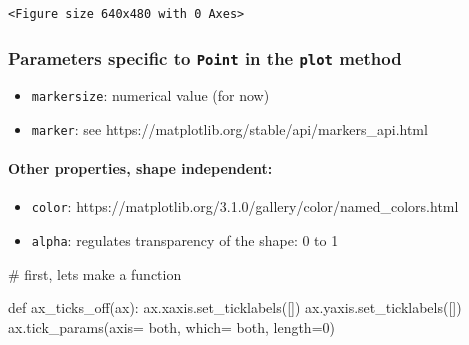 \documentclass[
  letterpaper,
  DIV=11,
  numbers=noendperiod]{scrreprt}
\let\oldparagraph\paragraph
\renewcommand{\paragraph}[1]{\oldparagraph{#1}\mbox{}}
\newenvironment{Shaded}{\begin{snugshade}}{\end{snugshade}}
\newcommand{\CommentTok}[1]{\textcolor[rgb]{0.37,0.37,0.37}{#1}}
\newcommand{\DecValTok}[1]{\textcolor[rgb]{0.68,0.00,0.00}{#1}}
\newcommand{\KeywordTok}[1]{\textcolor[rgb]{0.00,0.23,0.31}{#1}}
\newcommand{\NormalTok}[1]{\textcolor[rgb]{0.00,0.23,0.31}{#1}}
\newcommand{\OperatorTok}[1]{\textcolor[rgb]{0.37,0.37,0.37}{#1}}
\newcommand{\StringTok}[1]{\textcolor[rgb]{0.13,0.47,0.30}{#1}}
\providecommand{\tightlist}{%
  \setlength{\itemsep}{0pt}\setlength{\parskip}{0pt}}\usepackage{longtable,booktabs,array}
\begin{document}
\begin{verbatim}
<Figure size 640x480 with 0 Axes>
\end{verbatim}

\hypertarget{parameters-specific-to-point-in-the-plot-method}{%
\subsubsection{\texorpdfstring{Parameters specific to \texttt{Point} in
the \texttt{plot}
method}{Parameters specific to Point in the plot method}}\label{parameters-specific-to-point-in-the-plot-method}}

\begin{itemize}
\tightlist
\item
  \texttt{markersize}: numerical value (for now)
\item
  \texttt{marker}: see
  https://matplotlib.org/stable/api/markers\_api.html
\end{itemize}

\hypertarget{other-properties-shape-independent}{%
\paragraph{Other properties, shape
independent:}\label{other-properties-shape-independent}}

\begin{itemize}
\tightlist
\item
  \texttt{color}:
  https://matplotlib.org/3.1.0/gallery/color/named\_colors.html
\item
  \texttt{alpha}: regulates transparency of the shape: 0 to 1
\end{itemize}

\begin{Shaded}
\begin{Highlighting}[]
\CommentTok{\# first, let\textquotesingle{}s make a function}

\KeywordTok{def}\NormalTok{ ax\_ticks\_off(ax):}
\NormalTok{    ax.xaxis.set\_ticklabels([])}
\NormalTok{    ax.yaxis.set\_ticklabels([])}
\NormalTok{    ax.tick\_params(axis}\OperatorTok{=} \StringTok{\textquotesingle{}both\textquotesingle{}}\NormalTok{, which}\OperatorTok{=} \StringTok{\textquotesingle{}both\textquotesingle{}}\NormalTok{, length}\OperatorTok{=}\DecValTok{0}\NormalTok{)}
\end{Highlighting}
\end{Shaded}
\end{document}
